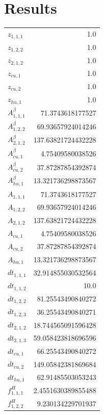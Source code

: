 \documentclass{article}%
\makeatletter
\let\mcnewpage=\newpage%
\newcommand{\TrickSupertabularIntoMulticols}{%
\renewcommand\newpage{%
\if@firstcolumn%
\hrule width\linewidth height0pt%
\columnbreak%
\else%
\mcnewpage%
\fi%
}%
}%
\makeatother
\begin{document}
\section{Results}%
\thispagestyle{plain}%
\begin{multicols*}{3}%
\TrickSupertabularIntoMulticols%
%
\begin{supertabular}{lr}%
	$z_{1,1,1}$ & 1.0 \\%
	$z_{1,2,2}$ & 1.0 \\%
	$z_{2,1,2}$ & 1.0 \\%
	$z_{cu,1}$ & 1.0 \\%
	$z_{cu,2}$ & 1.0 \\%
	$z_{hu,1}$ & 1.0 \\%
	$A_{1,1,1}^{\beta}$ & 71.3743618177527 \\%
	$A_{1,2,2}^{\beta}$ & 69.93657924014246 \\%
	$A_{2,1,2}^{\beta}$ & 137.63821724432228 \\%
	$A_{cu,1}^{\beta}$ & 4.75409580038526 \\%
	$A_{cu,2}^{\beta}$ & 37.87287854392874 \\%
	$A_{hu,1}^{\beta}$ & 13.321736298873567 \\%
	$A_{1,1,1}$ & 71.3743618177527 \\%
	$A_{1,2,2}$ & 69.93657924014246 \\%
	$A_{2,1,2}$ & 137.63821724432228 \\%
	$A_{cu,1}$ & 4.75409580038526 \\%
	$A_{cu,2}$ & 37.87287854392874 \\%
	$A_{hu,1}$ & 13.321736298873567 \\%
	$dt_{1,1,1}$ & 32.914855030532564 \\%
	$dt_{1,1,2}$ & 10.0 \\%
	$dt_{1,2,2}$ & 81.25543490840272 \\%
	$dt_{1,2,3}$ & 36.25543490840271 \\%
	$dt_{2,1,2}$ & 18.744565091596428 \\%
	$dt_{2,1,3}$ & 59.058423818696596 \\%
	$dt_{cu,1}$ & 66.25543490840272 \\%
	$dt_{cu,2}$ & 149.05842381869684 \\%
	$dt_{hu,1}$ & 62.91485503053243 \\%
	$f_{1,1,1}^{H}$ & 2.4551630389855488 \\%
	$f_{1,2,2}^{H}$ & 9.230134229701937 \\%

\end{supertabular}
\end{multicols*}
\end{document}
